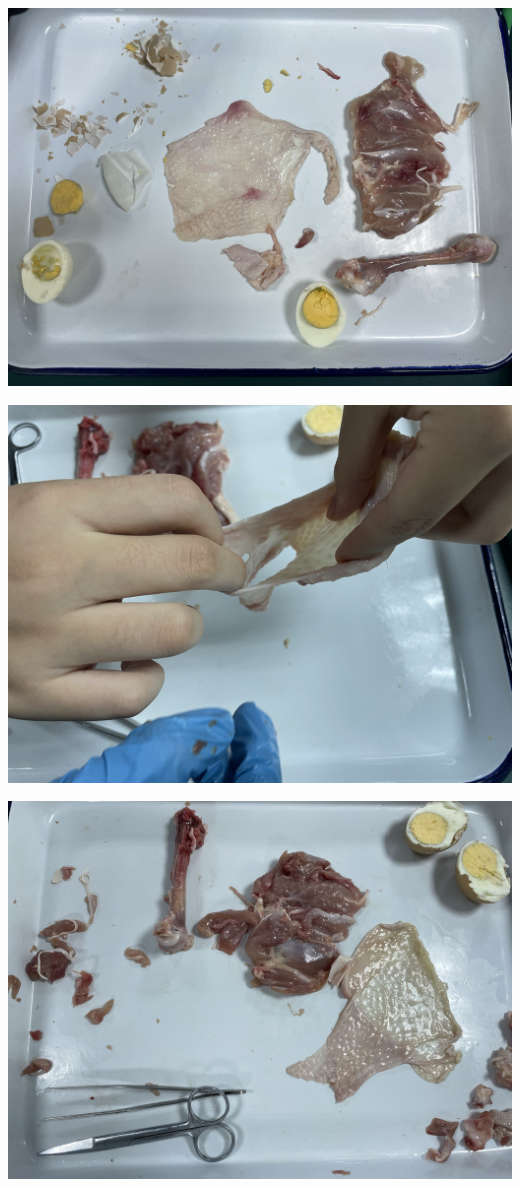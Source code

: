 \documentclass[
]{book}
\begin{document}
\includegraphics{./img/exp-2-3.jpg}

\includegraphics{./img/exp-2-4.jpg}

\includegraphics{./img/exp-2-5.jpg}
\end{document}
